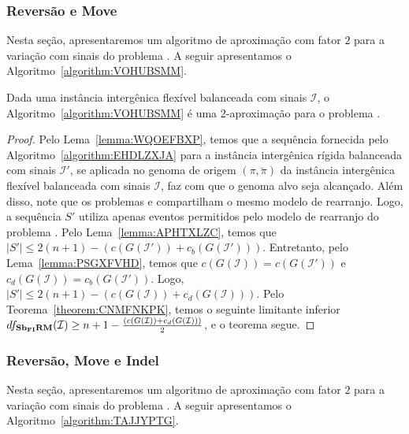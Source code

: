 \subsubsection{Reversão e Move}

Nesta seção, apresentaremos um algoritmo de aproximação com fator $2$ para a variação com sinais do problema \SbFIRM{}. A seguir apresentamos o Algoritmo~\ref{algorithm:VOHUBSMM}.



\begin{theorem}\label{theorem:NBFXUXJG}
Dada uma instância intergênica flexível balanceada com sinais $\mathcal{I}$, o Algoritmo~\ref{algorithm:VOHUBSMM} é uma $2$-aproximação para o problema \SbFIRM{}.
\end{theorem}
\begin{proof}
Pelo Lema~\ref{lemma:WQOEFBXP}, temos que a sequência fornecida pelo Algoritmo~\ref{algorithm:EHDLZXJA} para a instância intergênica rígida balanceada com sinais $\mathcal{I'}$, se aplicada no genoma de origem $(\pi,\breve\pi)$ da instância intergênica flexível balanceada com sinais $\mathcal{I}$, faz com que o genoma alvo seja alcançado. Além disso, note que os problemas \SbIRM{} e \SbFIRM{} compartilham o mesmo modelo de rearranjo. Logo, a sequência $S'$ utiliza apenas eventos permitidos pelo modelo de rearranjo do problema \SbFIRM{}. Pelo Lema~\ref{lemma:APHTXLZC}, temos que $|S'| \le 2(n + 1) - (c(G(\mathcal{I}')) + c_b(G(\mathcal{I}')))$. Entretanto, pelo Lema~\ref{lemma:PSGXFVHD}, temos que $c(G(\mathcal{I})) = c(G(\mathcal{I}'))$ e $c_d(G(\mathcal{I})) = c_b(G(\mathcal{I}'))$. Logo, $|S'| \le 2(n + 1) - (c(G(\mathcal{I})) + c_d(G(\mathcal{I})))$. Pelo Teorema~\ref{theorem:CNMFNKPK}, temos o seguinte limitante inferior $df_{\textbf{Sb\textsubscript{FI}RM}}(\mathcal{I}) \ge {n+1} - \frac{(c(G(\mathcal{I})) + c_d(G(\mathcal{I})))}{2}$, e o teorema segue.
\end{proof}

\subsubsection{Reversão, Move e Indel}

Nesta seção, apresentaremos um algoritmo de aproximação com fator $2$ para a variação com sinais do problema \SbFIRMI{}. A seguir apresentamos o Algoritmo~\ref{algorithm:TAJJYPTG}.

